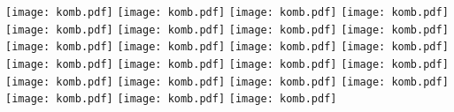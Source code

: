\documentclass[12pt,a4paper]{article}
\begin{document}
\pagestyle{empty}
\newcommand{\scale}{0.72}
\begin{center}
\texttt{[image: komb.pdf]}
\texttt{[image: komb.pdf]}
\texttt{[image: komb.pdf]}
\texttt{[image: komb.pdf]}
\texttt{[image: komb.pdf]}
\texttt{[image: komb.pdf]}
\texttt{[image: komb.pdf]}
\texttt{[image: komb.pdf]}
\texttt{[image: komb.pdf]}
\texttt{[image: komb.pdf]}
\texttt{[image: komb.pdf]}
\texttt{[image: komb.pdf]}
\texttt{[image: komb.pdf]}
\texttt{[image: komb.pdf]}
\texttt{[image: komb.pdf]}
\texttt{[image: komb.pdf]}
\texttt{[image: komb.pdf]}
\texttt{[image: komb.pdf]}
\texttt{[image: komb.pdf]}
\texttt{[image: komb.pdf]}
\texttt{[image: komb.pdf]}
\texttt{[image: komb.pdf]}
\texttt{[image: komb.pdf]}
\end{center}
\end{document}
